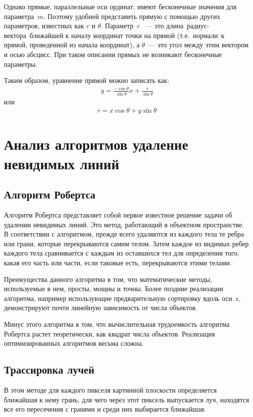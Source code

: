 Однако прямые, параллельные оси ординат, имеют бесконечные значения для параметра \(m\). Поэтому удобней представить прямую с помощью других параметров, известных как \(r\) и \(\theta\). Параметр \(r\)  — это длина радиус-вектора ближайшей к началу координат точки на прямой (т.е. нормали к прямой, проведенной из начала координат), а \(\theta\) — это угол между этим вектором и осью абсцисс. При таком описании прямых не возникают бесконечные параметры.

Таким образом, уравнение прямой можно записать как:
\begin{gather}
y = \frac{-\cos{\theta}}{\sin{\theta}}x + \frac{r}{\sin {\theta}}
\end{gather}
или
\begin{gather}
r = x\cos{\theta} + y\sin{\theta}
\end{gather}

\section{Анализ алгоритмов удаление невидимых линий}
\subsection{Алгоритм Робертса}
Алгоритм Робертса представляет собой первое известное решение задачи об удалении невидимых линий. Это метод, работающий в объектном пространстве. В соответствии с алгоритмом, прежде всего удаляются из каждого тела те ребра или грани, которые перекрываются самим телом. Затем каждое из видимых ребер каждого тела сравнивается с каждым из оставшихся тел для определения того, какая его часть или части, если таковые есть, перекрываются этими телами.
 
Преимущества данного алгоритма в том, что математические методы, используемые в нем, просты, мощны и точны. Более поздние реализации алгоритма, например использующие предварительную сортировку вдоль оси z, демонстрируют почти линейную зависимость от числа объектов.

Минус этого алгоритма в том, что вычислительная трудоемкость алгоритма Робертса растет теоретически, как квадрат числа объектов. Реализация оптимизированных алгоритмов весьма сложна.

\subsection{Трассировка лучей}
В этом методе для каждого пикселя картинной плоскости определяется ближайшая к нему грань, для чего через этот пиксель выпускается луч, находятся все его пересечения с гранями и среди них выбирается ближайшая. 

